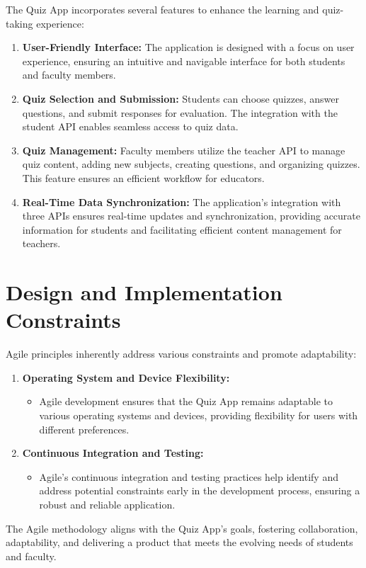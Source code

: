 The Quiz App incorporates several features to enhance the learning and quiz-taking experience:

\begin{enumerate}
    \item \textbf{User-Friendly Interface:} The application is designed with a focus on user experience, ensuring an intuitive and navigable interface for both students and faculty members.
    \item \textbf{Quiz Selection and Submission:} Students can choose quizzes, answer questions, and submit responses for evaluation. The integration with the student API enables seamless access to quiz data.
    \item \textbf{Quiz Management:} Faculty members utilize the teacher API to manage quiz content, adding new subjects, creating questions, and organizing quizzes. This feature ensures an efficient workflow for educators.
    \item \textbf{Real-Time Data Synchronization:} The application's integration with three APIs ensures real-time updates and synchronization, providing accurate information for students and facilitating efficient content management for teachers.
\end{enumerate}

\section{Design and Implementation Constraints}

Agile principles inherently address various constraints and promote adaptability:

\begin{enumerate}
    \item \textbf{Operating System and Device Flexibility:}
    \begin{itemize}
        \item Agile development ensures that the Quiz App remains adaptable to various operating systems and devices, providing flexibility for users with different preferences.
    \end{itemize}
    
    \item \textbf{Continuous Integration and Testing:}
    \begin{itemize}
        \item Agile's continuous integration and testing practices help identify and address potential constraints early in the development process, ensuring a robust and reliable application.
    \end{itemize}
\end{enumerate}

The Agile methodology aligns with the Quiz App's goals, fostering collaboration, adaptability, and delivering a product that meets the evolving needs of students and faculty.
